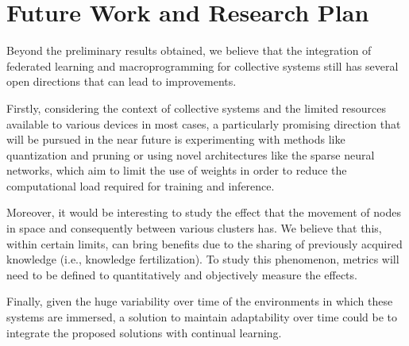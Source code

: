 \documentclass[runningheads]{llncs}
\begin{document}
\section{Future Work and Research Plan}\label{sec:future}

Beyond the preliminary results obtained, we believe that the integration of federated learning and macroprogramming for collective systems still has several
 open directions that can lead to improvements. 

Firstly, considering the context of collective systems and the limited resources available to various devices in most cases, 
 a particularly promising direction that will be pursued in the near future is 
 experimenting with methods like quantization and pruning or using novel architectures like the sparse neural networks, 
 which aim to limit the use of weights in order to reduce the computational load required for training and inference.

Moreover, it would be interesting to study the effect that the movement of nodes in space and consequently between various clusters has. 
%
We believe that this, within certain limits, can bring benefits due to the sharing of previously acquired knowledge (i.e., knowledge fertilization). 
%
To study this phenomenon, metrics will need to be defined to quantitatively and objectively measure the effects.

Finally, given the huge variability over time of the environments in which these systems are immersed, a solution to maintain adaptability over time could 
 be to integrate the proposed solutions with continual learning.
\end{document}
